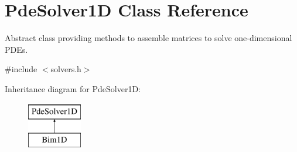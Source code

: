 \hypertarget{classPdeSolver1D}{\section{Pde\-Solver1\-D Class Reference}
\label{classPdeSolver1D}
}


Abstract class providing methods to assemble matrices to solve one-\/dimensional P\-D\-Es.  




{\ttfamily \#include $<$solvers.\-h$>$}

Inheritance diagram for Pde\-Solver1\-D\-:\begin{figure}[H]
\begin{center}
\leavevmode
\includegraphics[height=2.000000cm]{classPdeSolver1D}
\end{center}
\end{figure}
